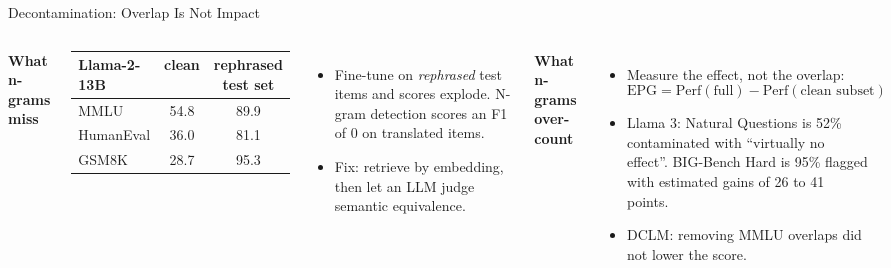 \begin{frame}{Decontamination: Overlap Is Not Impact}
    \begin{columns}[T,onlytextwidth]
        \textbf{What n-grams miss}
        \begin{center}
        \small
        \begin{adjustbox}{max width=\linewidth}\begin{tabular}{lcc}
            \toprule
            \textbf{Llama-2-13B} & \textbf{clean} & \textbf{rephrased test set} \\
            \midrule
            MMLU & 54.8 & 89.9 \\
            HumanEval & 36.0 & 81.1 \\
            GSM8K & 28.7 & 95.3 \\
            \bottomrule
        \end{tabular}\end{adjustbox}
        \end{center}
        \begin{itemize}\itemsep0.3em
            \item Fine-tune on \emph{rephrased} test items and scores explode. N-gram detection scores an F1 of 0 on translated items.
            \item Fix: retrieve by embedding, then let an LLM judge semantic equivalence.
        \end{itemize}
        \textbf{What n-grams over-count}
        \begin{itemize}\itemsep0.3em
            \item Measure the effect, not the overlap:
            \[
                \mathrm{EPG}=\mathrm{Perf}(\text{full})-\mathrm{Perf}(\text{clean subset})
            \]
            \item Llama 3: Natural Questions is 52\% contaminated with ``virtually no effect''. BIG-Bench Hard is 95\% flagged with estimated gains of 26 to 41 points.
            \item DCLM: removing MMLU overlaps did not lower the score.
        \end{itemize}
    \end{columns}
    \vspace{0.3em}
\end{frame}

